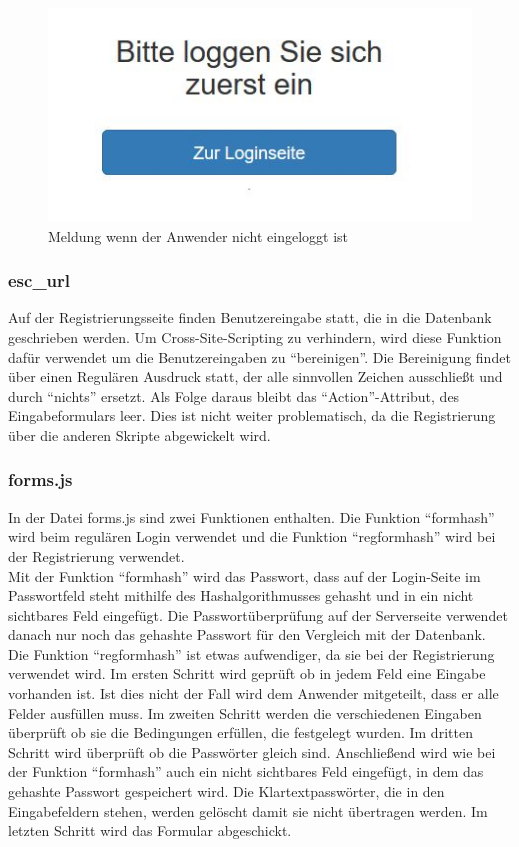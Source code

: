\begin{figure} [htb]
\begin{centering}
\includegraphics{Bilder/Kapitel4/notloggedin.jpg}
\caption[Meldung wenn der Anwender nicht eingeloggt ist]{Meldung wenn der Anwender nicht eingeloggt ist}
\label{notloggedin}
\end{centering}
\end{figure}


\subsubsection{esc\_url}
Auf der Registrierungsseite finden Benutzereingabe statt, die in die Datenbank geschrieben werden. Um Cross-Site-Scripting zu verhindern, wird diese Funktion dafür verwendet um die Benutzereingaben zu "`bereinigen"'. Die Bereinigung findet über einen Regulären Ausdruck statt, der alle sinnvollen Zeichen ausschließt und durch "`nichts"' ersetzt. Als Folge daraus bleibt das "`Action"'-Attribut, des Eingabeformulars leer. Dies ist nicht weiter problematisch, da die Registrierung über die anderen Skripte abgewickelt wird.

\subsubsection{forms.js}
In der Datei forms.js sind zwei Funktionen enthalten. Die Funktion "`formhash"' wird beim regulären Login verwendet und die Funktion "`regformhash"' wird bei der Registrierung verwendet. \\
Mit der Funktion "`formhash"' wird das Passwort, dass auf der Login-Seite im Passwortfeld steht mithilfe des Hashalgorithmusses gehasht und in ein nicht sichtbares Feld eingefügt. Die Passwortüberprüfung auf der Serverseite verwendet danach nur noch das gehashte Passwort für den Vergleich mit der Datenbank.\\
Die Funktion "`regformhash"' ist etwas aufwendiger, da sie bei der Registrierung verwendet wird. Im ersten Schritt wird geprüft ob in jedem Feld eine Eingabe vorhanden ist. Ist dies nicht der Fall wird dem Anwender mitgeteilt, dass er alle Felder ausfüllen muss. Im zweiten Schritt werden die verschiedenen Eingaben überprüft ob sie die Bedingungen erfüllen, die festgelegt wurden. Im dritten Schritt wird überprüft ob die Passwörter gleich sind. Anschließend wird wie bei der Funktion "`formhash"' auch ein nicht sichtbares Feld eingefügt, in dem das gehashte Passwort gespeichert wird. Die Klartextpasswörter, die in den Eingabefeldern stehen, werden gelöscht damit sie nicht übertragen werden. Im letzten Schritt wird das Formular abgeschickt.

